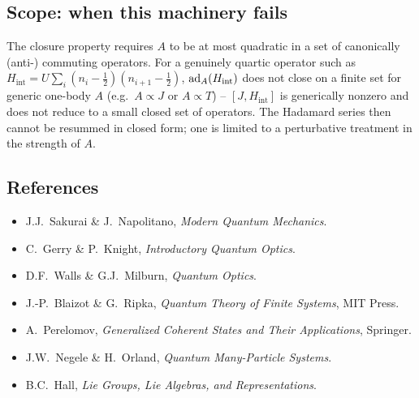 \documentclass[../../main.tex]{subfiles}
\begin{document}
\subsection{Scope: when this machinery fails}
The closure property requires $A$ to be at most quadratic in a set of canonically
(anti-) commuting operators. For a genuinely quartic operator such as
$H_{\mathrm{int}}=U\sum_i(n_i-\tfrac12)(n_{i+1}-\tfrac12)$, $\mathrm{ad}_A(H_{\mathrm{int}})$
does not close on a finite set for generic one-body $A$ (e.g.\ $A\propto J$ or
$A\propto T$) -- $[J,H_{\mathrm{int}}]$ is generically nonzero and does not reduce to a
small closed set of operators. The Hadamard series then cannot be resummed in closed
form; one is limited to a perturbative treatment in the strength of $A$.

\subsection{References}
\begin{itemize}
\item J.J.\ Sakurai \& J.\ Napolitano, \emph{Modern Quantum Mechanics}.
\item C.\ Gerry \& P.\ Knight, \emph{Introductory Quantum Optics}.
\item D.F.\ Walls \& G.J.\ Milburn, \emph{Quantum Optics}.
\item J.-P.\ Blaizot \& G.\ Ripka, \emph{Quantum Theory of Finite Systems}, MIT Press.
\item A.\ Perelomov, \emph{Generalized Coherent States and Their Applications}, Springer.
\item J.W.\ Negele \& H.\ Orland, \emph{Quantum Many-Particle Systems}.
\item B.C.\ Hall, \emph{Lie Groups, Lie Algebras, and Representations}.
\end{itemize}
\end{document}
